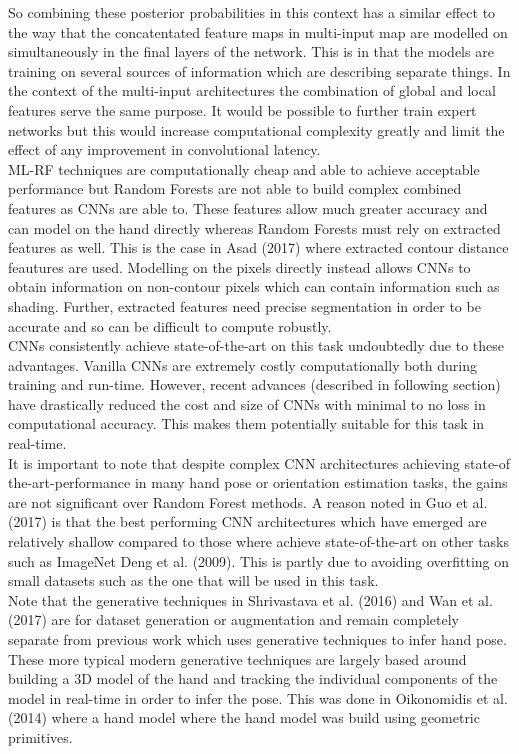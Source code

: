 \documentclass{article}
\begin{document}
So combining these posterior probabilities in this context has a similar effect to the way that the concatentated feature maps in multi-input map are modelled on simultaneously in the final layers of the network. This is in that the models are training on several sources of information which are describing separate things. In the context of the multi-input architectures the combination of global and local features serve the same purpose. It would be possible to further train expert networks but this would increase computational complexity greatly and limit the effect of any improvement in convolutional latency. \\

ML-RF techniques are computationally cheap and able to achieve acceptable performance but Random Forests are not able to build complex combined features as CNNs are able to. These features allow much greater accuracy and can model on the hand directly whereas Random Forests must rely on extracted features as well. This is the case in Asad (2017) where extracted contour distance feautures are used. Modelling on the pixels directly instead allows CNNs to obtain information on non-contour pixels which can contain information such as shading. Further, extracted features need precise segmentation in order to be accurate and so can be difficult to compute robustly. \\

 CNNs consistently achieve state-of-the-art on this task undoubtedly due to these advantages. Vanilla CNNs are extremely costly computationally both during training and run-time. However, recent advances (described in following section) have drastically reduced the cost and size of CNNs with minimal to no loss in computational accuracy. This makes them potentially suitable for this task in real-time. \\

It is important to note that despite complex CNN architectures achieving state-of the-art-performance in many hand pose or orientation estimation tasks, the gains are not significant over Random Forest methods. A reason noted in Guo et al. (2017) is that the best performing CNN architectures which have emerged are relatively shallow compared to those where achieve state-of-the-art on other tasks such as ImageNet Deng et al. (2009). This is partly due to avoiding overfitting on small datasets such as the one that will be used in this task. \\

Note that the generative techniques in Shrivastava et al. (2016) and Wan et al. (2017) are for dataset generation or augmentation and remain completely separate from previous work which uses generative techniques to infer hand pose. These more typical modern generative techniques are largely based around building a 3D model of the hand and tracking the individual components of the model in real-time in order to infer the pose. This was done  in Oikonomidis et al. (2014) where a hand model  where the hand model was build using geometric primitives.\\
\end{document}
